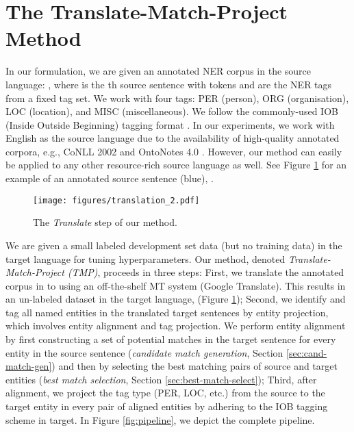 \documentclass[11pt,a4paper]{article}
\begin{document}
%
 

\section{The Translate-Match-Project Method \label{sec:tmp}}

In our formulation, we are given an annotated NER corpus in the source language: 
, 
where  
is the th source sentence with  tokens 
and  
are the NER tags from a fixed tag set. 
We work with four tags: PER (person), ORG (organisation), 
LOC (location), and MISC (miscellaneous). 
We follow the commonly-used IOB (Inside Outside Beginning) 
tagging format \cite{ramshaw1999text}. 
In our experiments, we work with English as the source language
due to the availability of high-quality annotated corpora, 
e.g., CoNLL 2002 \citep{sang2002introduction} 
and OntoNotes 4.0 \citep{weischedel2011ontonotes}. However, our method can easily be applied to any other resource-rich source language as well.
See Figure \ref{fig:translate} for an example 
of an annotated source sentence (blue), .

\begin{figure}[t!]
    \centering
    \texttt{[image: figures/translation\_2.pdf]}
    \caption{The \emph{Translate} step of our method.}
\label{fig:translate}
\end{figure}

We are given a small labeled development set data 
(but no training data)
in the target language  for tuning hyperparameters.
Our method, denoted \emph{Translate-Match-Project (TMP)}, proceeds in three steps:
First, we translate the annotated corpus in  to 
using an off-the-shelf MT system (Google Translate). 
This results in an un-labeled dataset in the target language, 
 (Figure \ref{fig:translate});
Second, we identify and tag all named entities in the translated target sentences 
by entity projection, which involves entity alignment and tag projection.
We perform entity alignment by first constructing 
a set of potential matches in the target sentence 
for every entity in the source sentence 
(\textit{candidate match generation}, Section \ref{sec:cand-match-gen}) 
and then by selecting the best matching pairs of source and target entities 
(\textit{best match selection}, Section \ref{sec:best-match-select}); 
Third, after alignment, we project the tag type (PER, LOC, etc.) from the source to the target entity 
in every pair of aligned entities 
by adhering to the IOB tagging scheme in target. 
In Figure \ref{fig:pipeline}, we depict the complete pipeline.
\end{document}
